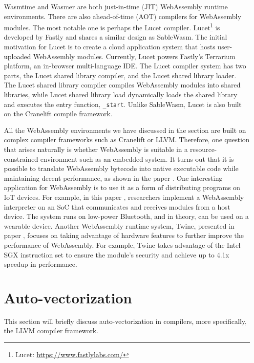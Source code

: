 Wasmtime and Wasmer are both just-in-time (JIT) WebAssembly runtime environments. There are also ahead-of-time (AOT) compilers for WebAssembly modules. The most notable one is perhaps the Lucet compiler. Lucet\footnote{Lucet: \url{https://www.fastlylabs.com/}} is developed by Fastly and shares a similar design as SableWasm. The initial motivation for Lucet is to create a cloud application system that hosts user-uploaded WebAssembly modules. Currently, Lucet powers Fastly's Terrarium platform, an in-browser multi-language IDE. The Lucet compiler system has two parts, the Lucet shared library compiler, and the Lucet shared library loader. The Lucet shared library compiler compiles WebAssembly modules into shared libraries, while Lucet shared library load dynamically loads the shared library and executes the entry function, \texttt{\_start}. Unlike SableWasm, Lucet is also built on the Cranelift compile framework.

All the WebAssembly environments we have discussed in the section are built on complex compiler frameworks such as Cranelift or LLVM. Therefore, one question that arises naturally is whether WebAssembly is suitable in a resource-constrained environment such as an embedded system. It turns out that it is possible to translate WebAssembly bytecode into native executable code while maintaining decent performance, as shown in the paper \cite{webassembly-embedded}. One interesting application for WebAssembly is to use it as a form of distributing programs on IoT devices. For example, in this paper \cite{webassembly-wearables}, researchers implement a WebAssembly interpreter on an SoC that communicates and receives modules from a host device. The system runs on low-power Bluetooth, and in theory, can be used on a wearable device. Another WebAssembly runtime system, Twine, presented in paper \cite{webassembly-sgx}, focuses on taking advantage of hardware features to further improve the performance of WebAssembly. For example, Twine takes advantage of the Intel SGX instruction set to ensure the module's security and achieve up to 4.1x speedup in performance.

\section*{Auto-vectorization}

This section will briefly discuss auto-vectorization in compilers, more specifically, the LLVM compiler framework.
